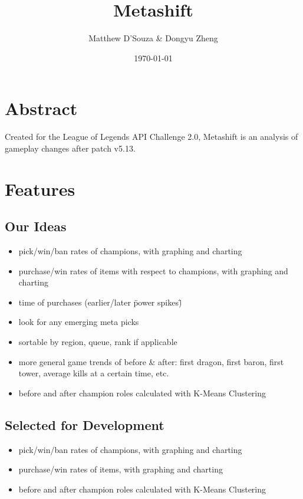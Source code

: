 \documentclass{article}
\title{Metashift}
\date{\today}
\author{Matthew D'Souza \& Dongyu Zheng}
\begin{document}
\maketitle
{}

\newpage
\tableofcontents

\newpage
{}



\section{Abstract}

Created for the League of Legends API Challenge 2.0, Metashift is an analysis of gameplay changes after patch v5.13.


\section{Features}

\subsection{Our Ideas}
\begin{itemize}
    \item pick/win/ban rates of champions, with graphing and charting
    \item purchase/win rates of items with respect to champions, with graphing and charting
    \item time of purchases (earlier/later \"power spikes\")
    \item look for any emerging meta picks
    \item sortable by region, queue, rank if applicable
    \item more general game trends of before \& after: first dragon, first baron, first tower, average kills at a certain time, etc.
    \item before and after champion roles calculated with K-Means Clustering
\end{itemize}

\subsection{Selected for Development}
\begin{itemize}
    \item pick/win/ban rates of champions, with graphing and charting
    \item purchase/win rates of items, with graphing and charting
    \item before and after champion roles calculated with K-Means Clustering
\end{itemize}
\end{document}
